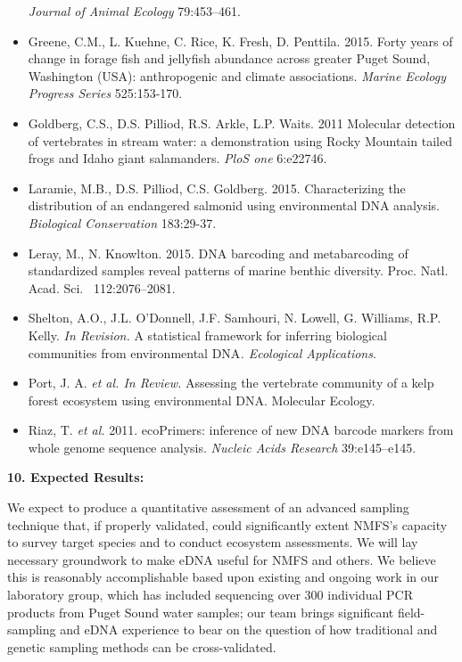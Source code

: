 \documentclass[]{article}
\begin{document}
\begin{itemize}
  \emph{Journal of Animal Ecology} 79:453--461.
\item
  Greene, C.M., L. Kuehne, C. Rice, K. Fresh, D. Penttila. 2015. Forty
  years of change in forage fish and jellyfish abundance across greater
  Puget Sound, Washington (USA): anthropogenic and climate associations.
  \emph{Marine Ecology Progress Series} 525:153-170.
\item
  Goldberg, C.S., D.S. Pilliod, R.S. Arkle, L.P. Waits. 2011 Molecular
  detection of vertebrates in stream water: a demonstration using Rocky
  Mountain tailed frogs and Idaho giant salamanders. \emph{PloS one}
  6:e22746.
\item
  Laramie, M.B., D.S. Pilliod, C.S. Goldberg. 2015. Characterizing the
  distribution of an endangered salmonid using environmental DNA
  analysis. \emph{Biological Conservation} 183:29-37.
\item
  Leray, M., N. Knowlton. 2015. DNA barcoding and metabarcoding of
  standardized samples reveal patterns of marine benthic diversity.
  Proc. Natl. Acad. Sci. {~112:2076--2081}.
\item
  Shelton, A.O., J.L. O'Donnell, J.F. Samhouri, N. Lowell, G. Williams,
  R.P. Kelly. \emph{In Revision.} A statistical framework for inferring
  biological communities from environmental DNA\emph{. Ecological
  Applications}.
\item
  Port, J. A. \emph{et al. In Review.} Assessing the vertebrate
  community of a kelp forest ecosystem using environmental DNA.
  Molecular Ecology.
\item
  Riaz, T. \emph{et al.} 2011. ecoPrimers: inference of new DNA barcode
  markers from whole genome sequence analysis. \emph{Nucleic Acids
  Research} 39:e145--e145.
\end{itemize}

\textbf{10. Expected Results:{~}}

We expect to produce a quantitative assessment of an advanced sampling
technique that, if properly validated, could significantly extent NMFS's
capacity to survey target species and to conduct ecosystem assessments.
We will lay necessary groundwork to make eDNA useful for NMFS and
others. We believe this is reasonably accomplishable based upon existing
and ongoing work in our laboratory group, which has included sequencing
over 300 individual PCR products from Puget Sound water samples; our
team brings significant field-sampling and eDNA experience to bear on
the question of how traditional and genetic sampling methods can be
cross-validated.
\end{document}
